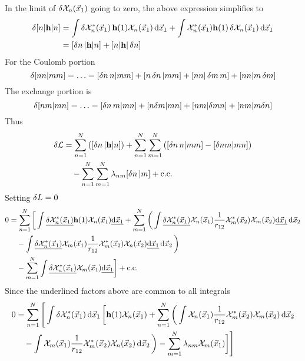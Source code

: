 \documentclass[12pt,a4paper,titlepage]{article}
\newcommand{\Chi}{\mathcal{X}} %
\begin{document}
In the limit of $\var{\Chi_{n}(\vec{x}_{1})}$ going to zero, the above expression simplifies to
\begin{equation}
\begin{aligned}
\var{[n|\vb{h}|n]}&=\int\var{\Chi_{n}^{*}(\vec{x}_{1})}\vb{h}(1)\Chi_{n}(\vec{x}_{1})\dd{\vec{x}_{1}}+\int\Chi_{n}^{*}(\vec{x}_{1})\vb{h}(1)\var{\Chi_{n}(\vec{x}_{1})}\dd{\vec{x}_{1}}\\
&=[\var{n}|\vb{h}|n]+[n|\vb{h}|\var{n}]
\end{aligned}
\end{equation}
For the Coulomb portion
\begin{equation}
\var{[nn|mm]}=\ldots=[\var{n}n|mm]+[n\var{n}|mm]+[nn|\var{m}m]+[nn|m\var{m}]
\end{equation}
The exchange portion is
\begin{equation}
\var{[nm|mn]}=\ldots=[\var{n}m|mn]+[n\delta{m}|mn]+[nm|\delta{m}n]+[nm|m\delta{n}]
\end{equation}
Thus
\begin{equation}
\begin{aligned}
\var{\mathcal{L}}&=\sum_{n=1}^{N}\qty([\var{n}|\vb{h}|n])+\sum_{n=1}^{N}\sum_{m=1}^{N}\qty([\var{n}n|mm]-[\delta{n}m|mn])\\
&\quad-\sum_{n=1}^{N}\sum_{m=1}^{N}\lambda_{nm}[\var{n}|m]+\qcc*
\end{aligned}
\end{equation}
Setting $\var{L}=0$
\begin{equation}
\begin{aligned}
0&=\sum_{n=1}^{N}\bigg[\int\underline{\var{\Chi_{n}^{*}(\vec{x}_{1})}}\vb{h}(1)\Chi_{n}(\vec{x}_{1})\underline{\dd{\vec{x}_{1}}}+\sum_{m=1}^{N}\bigg(\int\underline{\var{\Chi_{n}^{*}(\vec{x}_{1})}}\Chi_{n}(\vec{x}_{1})\frac{1}{r_{12}}\Chi_{m}^{*}(\vec{x}_{2})\Chi_{m}(\vec{x}_{2})\underline{\dd{\vec{x}_{1}}}\dd{\vec{x}_{2}}\\
&\quad-\int\underline{\var{\Chi_{n}^{*}(\vec{x}_{1})}}\Chi_{m}(\vec{x}_{1})\frac{1}{r_{12}}\Chi_{m}^{*}(\vec{x}_{2})\Chi_{n}(\vec{x}_{2})\underline{\dd{\vec{x}_{1}}}\dd{\vec{x}_{2}}\bigg)\\
&\quad-\sum_{m=1}^{N}\int\underline{\var{\Chi_{n}^{*}(\vec{x}_{1})}}\Chi_{m}(\vec{x}_{1})\underline{\dd{\vec{x}_{1}}}\bigg]+\qcc*
\end{aligned}
\end{equation}
Since the underlined factors above are common to all integrals
\begin{equation}
\begin{aligned}
0&=\sum_{n=1}^{N}\Bigg[\int\var{\Chi_{n}^{*}(\vec{x}_{1})}\dd{\vec{x}_{1}}\bigg[\vb{h}(1)\Chi_{n}(\vec{x}_{1})+\sum_{n=1}^{N}\bigg(\int\Chi_{n}(\vec{x}_{1})\frac{1}{r_{12}}\Chi_{m}^{*}(\vec{x}_{2})\Chi_{m}(\vec{x}_{2})\dd{\vec{x}_{2}}\\
&\quad-\int\Chi_{m}(\vec{x}_{1})\frac{1}{r_{12}}\Chi_{m}^{*}(\vec{x}_{2})\Chi_{n}(\vec{x}_{2})\dd{\vec{x}_{2}}\bigg)-\sum_{m=1}^{N}\lambda_{nm}\Chi_{m}(\vec{x}_{1})\bigg]\Bigg]
\end{aligned}
\end{equation}
\end{document}
